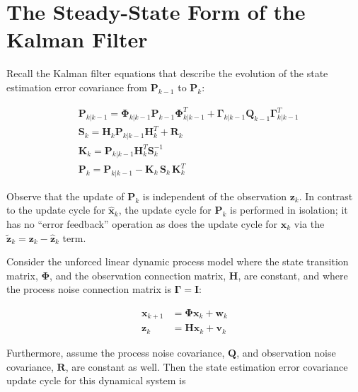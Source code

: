 \section{The Steady-State Form of the Kalman Filter}
\label{The Steady-State Form of the Kalman Filter}

Recall the Kalman filter equations that describe the evolution of the state estimation
error covariance from $\mathbf{P}_{k-1}$ to $\mathbf{P}_k$:

\begin{equation*}
    \begin{aligned}
        & \mathbf{P}_{k|k-1} = \mathbf{\Phi}_{k|k-1} \mathbf{P}_{k-1} \mathbf{\Phi}_{k|k-1}^T + \mathbf{\Gamma}_{k|k-1} \mathbf{Q}_{k-1} \mathbf{\Gamma}_{k|k-1}^T \\
        & \mathbf{S}_{k} = \mathbf{H}_k \mathbf{P}_{k|k-1} \mathbf{H}_k^T + \mathbf{R}_k \\
        & \mathbf{K}_{k} = \mathbf{P}_{k|k-1} \mathbf{H}_{k}^T \mathbf{S}_k^{-1} \\
        & \mathbf{P}_k = \mathbf{P}_{k|k-1} - \mathbf{K}_{k} \, \mathbf{S}_{k} \, \mathbf{K}_{k}^T
    \end{aligned}
\end{equation*}

Observe that the update of $\mathbf{P}_k$ is independent of the observation $\mathbf{z}_k$.
In contrast to the update cycle for $\hat{\mathbf{x}}_k$, the update cycle for $\mathbf{P}_k$
is performed in isolation; it has no “error feedback” operation as does the update cycle
for $\hat{\mathbf{x}}_k$ via the $\tilde{\mathbf{z}}_k = \mathbf{z}_k - \hat{\mathbf{z}}_k$
term.

Consider the unforced linear dynamic process model where the state transition matrix,
$\mathbf{\Phi}$, and the observation connection matrix, $\mathbf{H}$, are constant, and
where the process noise connection matrix is $\mathbf{\Gamma} =  \mathbf{I}$:

\begin{equation*}
    \begin{aligned}
        \mathbf{x}_{k+1} &= \mathbf{\Phi} \mathbf{x}_k + \mathbf{w}_k \\
        \mathbf{z}_k &= \mathbf{H} \mathbf{x}_k + \mathbf{v}_k
    \end{aligned}
\end{equation*}

Furthermore, assume the process noise covariance, $\mathbf{Q}$, and observation noise
covariance, $\mathbf{R}$, are constant as well. Then the state estimation error covariance
update cycle for this dynamical system is

